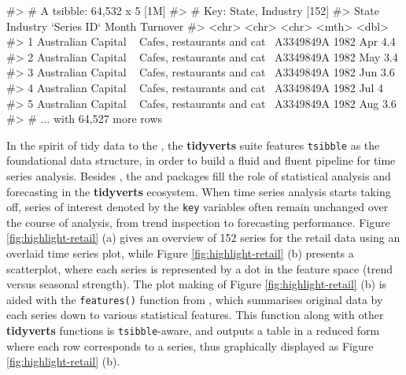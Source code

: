 \begin{Schunk}
\begin{Soutput}
#> # A tsibble: 64,532 x 5 [1M]
#> # Key:       State, Industry [152]
#>   State                Industry                    `Series ID`    Month Turnover
#>   <chr>                <chr>                       <chr>          <mth>    <dbl>
#> 1 Australian Capital ~ Cafes, restaurants and cat~ A3349849A   1982 Apr      4.4
#> 2 Australian Capital ~ Cafes, restaurants and cat~ A3349849A   1982 May      3.4
#> 3 Australian Capital ~ Cafes, restaurants and cat~ A3349849A   1982 Jun      3.6
#> 4 Australian Capital ~ Cafes, restaurants and cat~ A3349849A   1982 Jul      4  
#> 5 Australian Capital ~ Cafes, restaurants and cat~ A3349849A   1982 Aug      3.6
#> # ... with 64,527 more rows
\end{Soutput}
\end{Schunk}

In the spirit of tidy data to the 
\citep{Wickham2019}, the \textbf{tidyverts} suite features
\texttt{tsibble} as the foundational data structure, in order to build a
fluid and fluent pipeline for time series analysis. Besides
, the  and  packages
fill the role of statistical analysis and forecasting in the
\textbf{tidyverts} ecosystem. When time series analysis starts taking
off, series of interest denoted by the \texttt{key} variables often
remain unchanged over the course of analysis, from trend inspection to
forecasting performance. Figure \ref{fig:highlight-retail} (a) gives an
overview of 152 series for the retail data using an overlaid time series
plot, while Figure \ref{fig:highlight-retail} (b) presents a
scatterplot, where each series is represented by a dot in the feature
space (trend versus seasonal strength). The plot making of Figure
\ref{fig:highlight-retail} (b) is aided with the \texttt{features()}
function from , which summarises original data by each
series down to various statistical features. This function along with
other \textbf{tidyverts} functions is \texttt{tsibble}-aware, and
outputs a table in a reduced form where each row corresponds to a
series, thus graphically displayed as Figure \ref{fig:highlight-retail}
(b).

